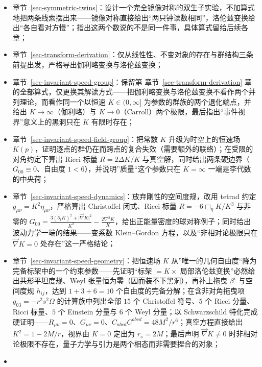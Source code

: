 \documentclass[
  chinese,
  a4paper,
  UTF8,
  12pt,
  oneside,
  openany]{ctexbook}
\providecommand{\tightlist}{%
  \setlength{\itemsep}{0pt}\setlength{\parskip}{0pt}}
\theoremstyle{plain}
\theoremstyle{plain}
\theoremstyle{plain}
\theoremstyle{definition}
\theoremstyle{plain}
\theoremstyle{plain}
\theoremstyle{remark}
\begin{document}
\begin{itemize}
\tightlist
\item
  章节~\ref{sec-symmetric-twins}：设计一个完全镜像对称的双生子实验，不加算式地把两条线索摆出来------镜像对称直接给出``两只钟读数相同''，洛伦兹变换给出``各自看对方慢''；指出这两个数说的不是同一件事，具体算式留给后续各章；
\item
  章节~\ref{sec-transform-derivation}：仅从线性性、不变对象的存在与群结构三条前提出发，严格导出伽利略变换与洛伦兹变换；
\item
  章节~\ref{sec-invariant-speed-group}：保留第
  章节~\ref{sec-transform-derivation}
  章的全部算式，仅更换其解读方式------把伽利略变换与洛伦兹变换不看作两个并列理论，而看作同一个以恒速
  \(K\in(0,\infty]\) 为参数的群族的两个退化端点，并给出
  \(K\to\infty\)（伽利略）与
  \(K\to0\)（Carroll）两个极限，最后指出``事件视界''意义上的黑洞只在
  \(K\) 有限时存在；
\item
  章节~\ref{sec-invariant-speed-field-group}：把常数 \(K\)
  升级为时空上的恒速场
  \(K(p)\)，证明逐点的群仍在而跨点的复合失效（需要额外的联络）；在受限的对角约定下算出
  Ricci 标量 \(R=2\Delta K/K\)
  与真空解，同时给出两条硬边界（\(G_{00}\equiv0\)、自由度
  \(1<6\)），并说明''质量``这个参数只在 \(K=\infty\)
  一端是李代数的中央荷；
\item
  章节~\ref{sec-invariant-speed-dynamics}：放弃刚性的空间度规，改用
  tetrad 约定 \(g_{\mu\nu}=K^{2}\eta_{\mu\nu}\)，严格算出 Christoffel
  闭式、Ricci 标量 \(R=-6\Box_\eta K/K^{3}\) 与非零的
  \(G_{00}=\frac{3(\partial_tK)^{2}+\lvert\vec\nabla K\rvert^{2}}{K^{2}}-\frac{2\nabla^{2}K}{K}\)，给出正能量密度的球对称例子；同时给出波动力学一端的结果------变系数
  Klein--Gordon 方程，以及``非相对论极限只在 \(\vec\nabla K=0\)
  处存在''这一严格结论；
\item
  章节~\ref{sec-invariant-speed-geometry}：把恒速场 \(K\)
  从''唯一的几何自由度``降为完备标架中的一个约束参数------先证明``标架
  \(=K\times\) 局部洛伦兹变换''必然给出共形平坦度规、Weyl
  张量恒为零（因而装不下黑洞），再补上拖曳 \(\beta^{i}\) 与空间度规
  \(h_{ij}\)，达到 \(1+3+6=10\) 个自由度的完备分解；在含非对角拖曳项
  \(g_{03}=-r^{2}s^{2}\Omega\) 的计算族中列出全部 \(15\) 个 Christoffel
  符号、\(5\) 个 Ricci 分量、Ricci 标量、\(5\) 个 Einstein 分量与 \(6\)
  个 Weyl 分量；以 Schwarzschild
  特化完成硬证明------\(R_{\mu\nu}=0\)、\(G_{\mu\nu}=0\)、\(C_{abcd}C^{abcd}=48M^{2}/r^{6}\)；真空方程直接给出
  \(K^{2}=1-2M/r\)，视界由 \(K=0\) 定出为 \(r_s=2M\)；最后声明
  \(\vec\nabla K\neq0\)
  时非相对论极限不存在，量子力学与引力是两个相态而非需要捏合的对象；
\item

\end{itemize}
\end{document}

